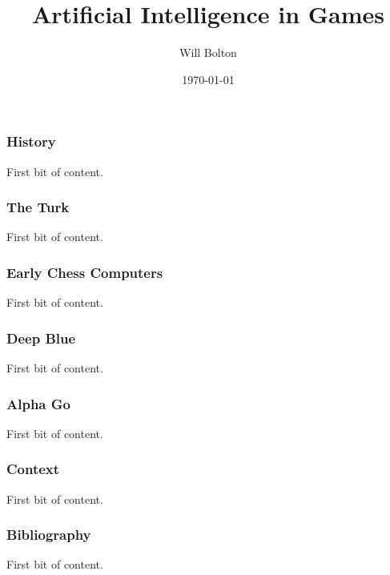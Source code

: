 \documentclass{beamer}
\title[Artificial Intelligence in Games]{Artificial Intelligence in Games}
\author{Will Bolton}
\date{\today}
\begin{document}
\titlepage %

\begin{frame} %
\frametitle{History}
First bit of content.
\end{frame}

\begin{frame} %
\frametitle{The Turk}
First bit of content.
\end{frame}

\begin{frame} %
\frametitle{Early Chess Computers}
First bit of content.
\end{frame}

\begin{frame} %
\frametitle{Deep Blue}
First bit of content.
\end{frame}

\begin{frame} %
\frametitle{Alpha Go}
First bit of content.
\end{frame}

\begin{frame} %
\frametitle{Context}
First bit of content.
\end{frame}

\begin{frame} %
\frametitle{Bibliography}
First bit of content.
\end{frame}
\end{document}
